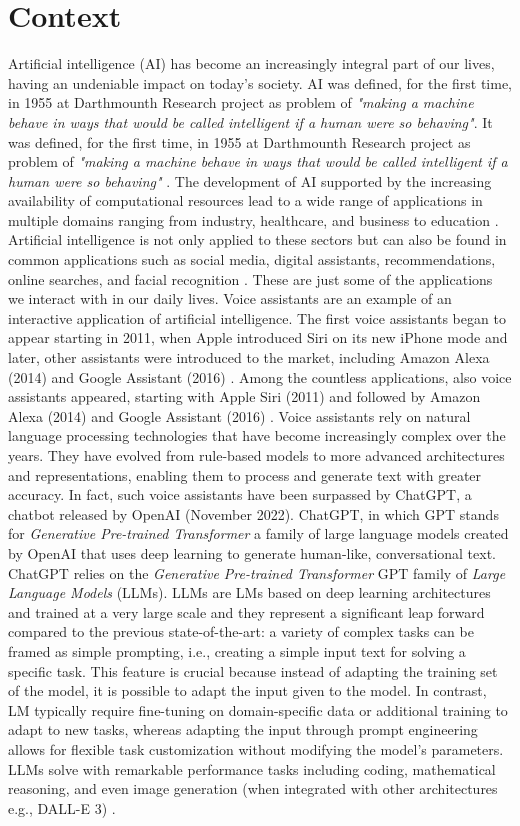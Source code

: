 \section{Context}
Artificial intelligence (AI) has become an increasingly integral part of our lives, having an undeniable impact on today’s society. AI was defined, for the first time, in 1955 at Darthmounth Research project as problem of \textit{"making a machine behave in ways that would be called intelligent if a human were so behaving"}\cite{kaplan2019siri}. 
It was defined, for the first time, in 1955 at Darthmounth Research project as problem of \textit{"making a machine behave in ways that would be called intelligent if a human were so behaving"} \cite{kaplan2019siri}. The development of AI supported by the increasing availability of computational resources lead to a wide range of applications in multiple domains ranging from industry, healthcare, and business to education \cite{busnatu2022clinical}.  Artificial intelligence is not only applied to these sectors but can also be found in common applications such as social media, digital assistants, recommendations, online searches, and facial recognition \cite{ref1}. These are just some of the applications we interact with in our daily lives. Voice assistants are an example of an interactive application of artificial intelligence. The first voice assistants began to appear starting in 2011, when Apple introduced Siri on its new iPhone mode and later, other assistants were introduced to the market, including Amazon Alexa (2014) and Google Assistant (2016) \cite{ref2}.
Among the countless applications, also voice assistants appeared, starting with Apple Siri (2011) and followed by Amazon Alexa (2014) and Google Assistant (2016) \cite{ref2}. Voice assistants rely on natural language processing technologies that have become increasingly complex over the years. They have evolved from rule-based models to more advanced architectures and representations, enabling them to process and generate text with greater accuracy. In fact, such voice assistants have been surpassed by ChatGPT, a chatbot released by OpenAI (November 2022). ChatGPT, in which GPT stands for \textit{Generative Pre-trained Transformer} a family of large language models created by OpenAI that uses deep learning to generate human-like, conversational text.
ChatGPT relies on the \textit{Generative Pre-trained Transformer} GPT family of \textit{Large Language Models} (LLMs).
LLMs are LMs based on deep learning architectures and trained at a very large scale and they represent a significant leap forward compared to the previous state-of-the-art: a variety of complex tasks can be framed as simple prompting, i.e., creating a simple input text for solving a specific task. This feature is crucial because instead of adapting the training set of the model, it is possible to adapt the input given to the model.
In contrast, LM typically require fine-tuning on domain-specific data or additional training to adapt to new tasks, whereas adapting the input through prompt engineering allows for flexible task customization without modifying the model's parameters.
LLMs solve with remarkable performance tasks including coding, mathematical reasoning, and even image generation (when integrated with other architectures e.g., DALL-E 3) \cite{ref3}.

